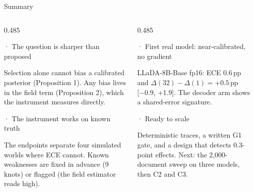 \documentclass[aspectratio=169,10pt,t]{beamer}
\newcommand{\pp}{\,pp\xspace}
\newcommand{\ci}[1]{{\color{ink2}\scriptsize[#1]}}
\newcommand{\paneltitle}[1]{{\color{accentdark}\small\firasemibold #1}\par\vspace{0.8mm}}
\begin{document}
\begin{frame}{Summary}
  \vspace{2mm}
  \begin{columns}[T,onlytextwidth]
    \begin{column}{0.485\textwidth}
      \begin{panel}[height=25mm]
        \paneltitle{1 · The question is sharper than proposed}
        Selection alone cannot bias a calibrated posterior (Proposition 1). Any bias lives
        in the field term (Proposition 2), which the instrument measures directly.
      \end{panel}
      \vspace{1.5mm}
      \begin{panel}[height=25mm]
        \paneltitle{2 · The instrument works on known truth}
        The endpoints separate four simulated worlds where ECE cannot. Known weaknesses are
        fixed in advance (9 knots) or flagged (the field estimator reads high).
      \end{panel}
    \end{column}
    \begin{column}{0.485\textwidth}
      \begin{panel}[height=25mm]
        \paneltitle{3 · First real model: near-calibrated, no gradient}
        LLaDA-8B-Base fp16: ECE 0.6\pp and $\Delta(32) - \Delta(1) = +0.5$\pp
        \ci{−0.9, +1.9}. The decoder arm shows a shared-error signature.
      \end{panel}
      \vspace{1.5mm}
      \begin{panel}[height=25mm]
        \paneltitle{4 · Ready to scale}
        Deterministic traces, a written G1 gate, and a design that detects 0.3-point effects.
        Next: the 2,000-document sweep on three models, then C2 and C3.
      \end{panel}
    \end{column}
  \end{columns}
\end{frame}
\end{document}
